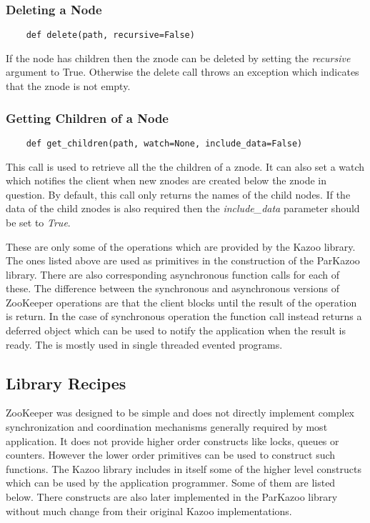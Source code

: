   \subsubsection{Deleting a Node}
  \begin{lstlisting}
    def delete(path, recursive=False)
  \end{lstlisting}
  If the node has children then the znode can be deleted by setting the \textit{recursive} argument to True. Otherwise the delete call throws an exception which indicates that the znode is not empty.
  
  \subsubsection{Getting Children of a Node}
  \begin{lstlisting}
    def get_children(path, watch=None, include_data=False)
  \end{lstlisting}
  This call is used to retrieve all the the children of a znode. It can also set a watch which notifies the client when new znodes are created below the znode in question. By default, this call only returns the names of the child nodes. If the data of the child znodes is also required then the \textit{include\_data} parameter should be set to \textit{True}.
  
  These are only some of the operations which are provided by the Kazoo library. The ones listed above are used as primitives in the construction of the ParKazoo library. There are also corresponding asynchronous function calls for each of these. The difference between the synchronous and asynchronous versions of ZooKeeper operations are that the client blocks until the result of the operation is return. In the case of synchronous operation the function call instead returns a deferred object which can be used to notify the application when the result is ready. The is mostly used in single threaded evented programs.
  
\subsection{Library Recipes}
  ZooKeeper was designed to be simple and does not directly implement complex synchronization and coordination mechanisms generally required by most application. It does not provide higher order constructs like locks, queues or counters. However the lower order primitives can be used to construct such functions. The Kazoo library includes in itself some of the higher level constructs which can be used by the application programmer. Some of them are listed below. There constructs are also later implemented in the ParKazoo library without much change from their original Kazoo implementations.
  
